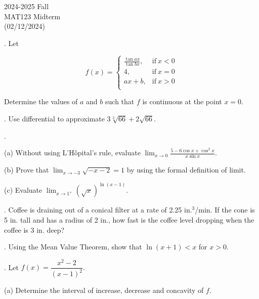 \documentclass{article}
\begin{document}
\pagestyle{empty}
\large

\begin{center}
2024-2025 Fall \\MAT123 Midterm\\(02/12/2024)
\end{center}

. Let

\[
f(x) =
\begin{cases}
\displaystyle \frac{\tan ax}{\tan bx}, & \text{if}\ x < 0 \\[1em]
4, & \text{if}\ x = 0 \\[1em]
ax+b, & \text{if}\ x >0 \\
\end{cases}
\]

\hfill

\noindent Determine the values of $a$ and $b$ such that $f$ is continuous at the point $x=0$.

\hfill

. Use differential to approximate $3\sqrt[3]{66}+2\sqrt{66}$.

\hfill

.

\hfill

\noindent (a) Without using L'Hôpital's rule, evaluate $\displaystyle \lim_{x\to 0} \frac{5-6\cos x + \cos^2x}{x\sin x}$.

\hfill

\noindent (b) Prove that $\displaystyle \lim_{x\to -3} \sqrt{-x-2} = 1$ by using the formal definition of limit.

\hfill

\noindent (c) Evaluate $\displaystyle\lim_{x\to1^+}\left(\sqrt x\right)^{\ln(x-1)}$.

\hfill

. Coffee is draining out of a conical filter at a rate of 2.25 in.$^3$/min. If the cone is 5 in. tall and has a radius of 2 in., how fast is the coffee level dropping when the coffee is 3 in. deep?

\hfill

. Using the Mean Value Theorem, show that $\ln(x+1) < x$ for $x > 0$.

\hfill

. Let $f(x)=\dfrac{x^2-2}{(x-1)^2}$.

\hfill

(a) Determine the interval of increase, decrease and concavity of $f$.
\end{document}
